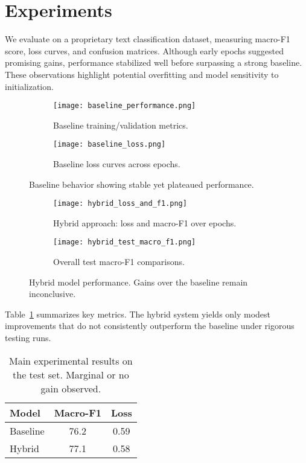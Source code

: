 \documentclass{article}
\begin{document}
\section{Experiments}
We evaluate on a proprietary text classification dataset, measuring macro-F1 score, loss curves, and confusion matrices. Although early epochs suggested promising gains, performance stabilized well before surpassing a strong baseline. These observations highlight potential overfitting and model sensitivity to initialization.

\begin{figure}[t]
\centering
\begin{subfigure}[b]{0.48\textwidth}
    \texttt{[image: baseline\_performance.png]}
    \caption{Baseline training/validation metrics.}
\end{subfigure}
\hfill
\begin{subfigure}[b]{0.48\textwidth}
    \texttt{[image: baseline\_loss.png]}
    \caption{Baseline loss curves across epochs.}
\end{subfigure}
\caption{Baseline behavior showing stable yet plateaued performance.}
\label{fig:baseline_combined}
\end{figure}

\begin{figure}[t]
\centering
\begin{subfigure}[b]{0.48\textwidth}
    \texttt{[image: hybrid\_loss\_and\_f1.png]}
    \caption{Hybrid approach: loss and macro-F1 over epochs.}
\end{subfigure}
\hfill
\begin{subfigure}[b]{0.48\textwidth}
    \texttt{[image: hybrid\_test\_macro\_f1.png]}
    \caption{Overall test macro-F1 comparisons.}
\end{subfigure}
\caption{Hybrid model performance. Gains over the baseline remain inconclusive.}
\label{fig:hybrid_combined}
\end{figure}

Table~\ref{tab:main_results} summarizes key metrics. The hybrid system yields only modest improvements that do not consistently outperform the baseline under rigorous testing runs.

\begin{table}[h]
\centering
\caption{Main experimental results on the test set. Marginal or no gain observed.}
\label{tab:main_results}
\begin{tabular}{lcc}
\toprule
\textbf{Model} & \textbf{Macro-F1} & \textbf{Loss} \\
\midrule
Baseline & 76.2 & 0.59 \\
Hybrid & 77.1 & 0.58 \\
\bottomrule
\end{tabular}
\end{table}
\end{document}
